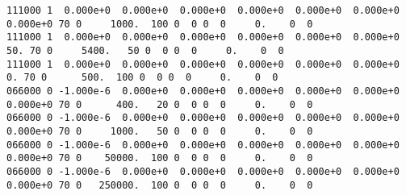 \begin{verbatim}
111000 1  0.000e+0  0.000e+0  0.000e+0  0.000e+0  0.000e+0  0.000e+0  0.000e+0 70 0     1000.  100 0  0 0  0     0.    0  0
111000 1  0.000e+0  0.000e+0  0.000e+0  0.000e+0  0.000e+0  0.000e+0       50. 70 0     5400.   50 0  0 0  0     0.    0  0
111000 1  0.000e+0  0.000e+0  0.000e+0  0.000e+0  0.000e+0  0.000e+0        0. 70 0      500.  100 0  0 0  0     0.    0  0
066000 0 -1.000e-6  0.000e+0  0.000e+0  0.000e+0  0.000e+0  0.000e+0  0.000e+0 70 0      400.   20 0  0 0  0     0.    0  0
066000 0 -1.000e-6  0.000e+0  0.000e+0  0.000e+0  0.000e+0  0.000e+0  0.000e+0 70 0     1000.   50 0  0 0  0     0.    0  0
066000 0 -1.000e-6  0.000e+0  0.000e+0  0.000e+0  0.000e+0  0.000e+0  0.000e+0 70 0    50000.  100 0  0 0  0     0.    0  0
066000 0 -1.000e-6  0.000e+0  0.000e+0  0.000e+0  0.000e+0  0.000e+0  0.000e+0 70 0   250000.  100 0  0 0  0     0.    0  0
\end{verbatim}
